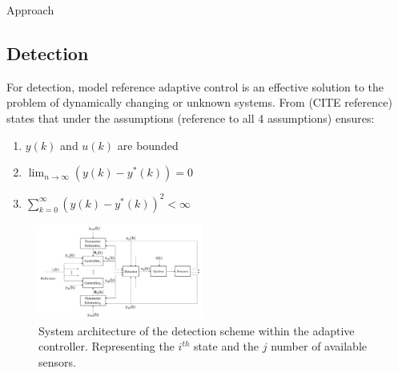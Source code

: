 \begin{section}{Approach}
\subsection{Detection}

For detection, model reference adaptive control is an effective solution to the problem of dynamically changing or unknown systems. From (CITE reference) states that under the assumptions (reference to all 4 assumptions) ensures:
	\begin{enumerate}[label=(\roman*),leftmargin=4\parindent]
	\item $y(k)$ and $u(k)$ are bounded 
	\item $\lim_{n\to\infty}(y(k)-y^*(k))=0$
	\item $\sum_{k=0}^\infty(y(k)-y^*(k))^2<\infty$
	\end{enumerate}
	
	\begin{figure}[ht!]
\vspace{1pt}
\centering
\includegraphics[width=0.48\textwidth]{con_and_det.png}
\caption{System architecture of the detection scheme within the adaptive controller. Representing the $i^{th}$ state and the $j$ number of available sensors.}
\label{fig:det_arch}
\end{figure}



\end{section}
